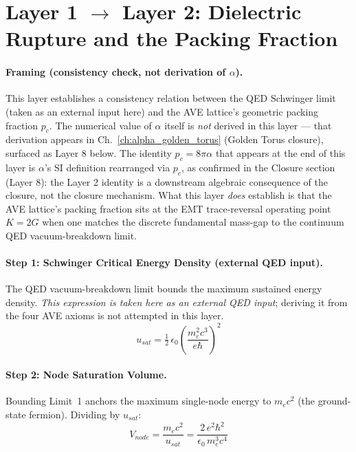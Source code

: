 \section{Layer 1 $\to$ Layer 2: Dielectric Rupture and the Packing Fraction}
\label{sec:layer12}

\paragraph{Framing (consistency check, not derivation of $\alpha$).}
This layer establishes a consistency relation between the QED Schwinger
limit (taken as an external input here) and the AVE lattice's geometric
packing fraction $p_c$. The numerical value of $\alpha$ itself is \emph{not}
derived in this layer --- that derivation appears in Ch.~\ref{ch:alpha_golden_torus}
(Golden Torus closure), surfaced as Layer 8 below. The identity
$p_c = 8\pi\alpha$ that appears at the end of this layer is $\alpha$'s
SI definition rearranged via $p_c$, as confirmed in the Closure
section (Layer 8): the Layer 2 identity is a downstream algebraic
consequence of the closure, not the closure mechanism. What this layer
\emph{does} establish is that the AVE lattice's packing fraction sits
at the EMT trace-reversal operating point $K = 2G$ when one matches the
discrete fundamental mass-gap to the continuum QED vacuum-breakdown limit.

\paragraph{Step 1: Schwinger Critical Energy Density (external QED input).}
The QED vacuum-breakdown limit bounds the maximum sustained energy
density. \emph{This expression is taken here as an external QED input};
deriving it from the four AVE axioms is not attempted in this layer.
\begin{equation}
    u_{sat}
    = \tfrac{1}{2}\,\epsilon_0 \!\left(\frac{m_e^2 c^3}{e\hbar}\right)^{\!2}
    \label{eq:usat}
\end{equation}

\paragraph{Step 2: Node Saturation Volume.}
Bounding Limit~1 anchors the maximum single-node energy to $m_e c^2$
(the ground-state fermion). Dividing by $u_{sat}$:
\begin{equation}
    V_{node}
    = \frac{m_e c^2}{u_{sat}}
    = \frac{2\,e^2 \hbar^2}{\epsilon_0\,m_e^3 c^4}
    \label{eq:Vnode}
\end{equation}

